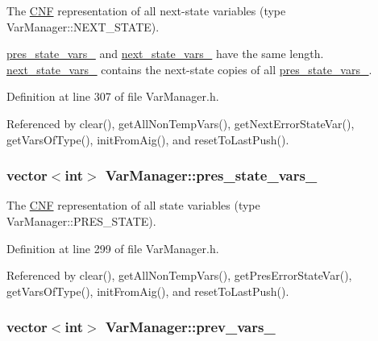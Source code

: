 The \hyperlink{classCNF}{C\-N\-F} representation of all next-\/state variables (type Var\-Manager\-::\-N\-E\-X\-T\-\_\-\-S\-T\-A\-T\-E). 

\hyperlink{classVarManager_a25edf00cec0e31f140aabdf3a245a54c}{pres\-\_\-state\-\_\-vars\-\_\-} and \hyperlink{classVarManager_a2a697fcb384c73821d88104ac904f4e9}{next\-\_\-state\-\_\-vars\-\_\-} have the same length. \hyperlink{classVarManager_a2a697fcb384c73821d88104ac904f4e9}{next\-\_\-state\-\_\-vars\-\_\-} contains the next-\/state copies of all \hyperlink{classVarManager_a25edf00cec0e31f140aabdf3a245a54c}{pres\-\_\-state\-\_\-vars\-\_\-}. 

Definition at line 307 of file Var\-Manager.\-h.



Referenced by clear(), get\-All\-Non\-Temp\-Vars(), get\-Next\-Error\-State\-Var(), get\-Vars\-Of\-Type(), init\-From\-Aig(), and reset\-To\-Last\-Push().

\hypertarget{classVarManager_a25edf00cec0e31f140aabdf3a245a54c}{
\subsubsection[{pres\-\_\-state\-\_\-vars\-\_\-}]{\setlength{\rightskip}{0pt plus 5cm}vector$<$int$>$ Var\-Manager\-::pres\-\_\-state\-\_\-vars\-\_\-\hspace{0.3cm}{\ttfamily [protected]}}}\label{classVarManager_a25edf00cec0e31f140aabdf3a245a54c}


The \hyperlink{classCNF}{C\-N\-F} representation of all state variables (type Var\-Manager\-::\-P\-R\-E\-S\-\_\-\-S\-T\-A\-T\-E). 



Definition at line 299 of file Var\-Manager.\-h.



Referenced by clear(), get\-All\-Non\-Temp\-Vars(), get\-Pres\-Error\-State\-Var(), get\-Vars\-Of\-Type(), init\-From\-Aig(), and reset\-To\-Last\-Push().

\hypertarget{classVarManager_add744e4a073f7fd7bc595b053ac94774}{
\subsubsection[{prev\-\_\-vars\-\_\-}]{\setlength{\rightskip}{0pt plus 5cm}vector$<$int$>$ Var\-Manager\-::prev\-\_\-vars\-\_\-\hspace{0.3cm}{\ttfamily [protected]}}}\label{classVarManager_add744e4a073f7fd7bc595b053ac94774}


